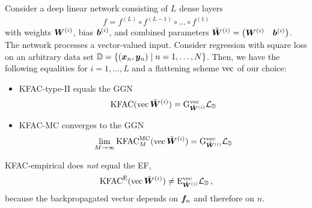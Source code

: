 \begin{test}
  Consider a deep linear network consisting of $L$ dense layers
  \begin{align*}
    f = f^{(L)} \circ f^{(L-1)} \circ \ldots \circ f^{(1)}
  \end{align*}
  with weights $\mW^{(i)}$, bias $\vb^{(i)}$, and combined parameters $\tilde{\mW}^{(i)} = \begin{pmatrix} \mW^{(i)} & \vb^{(i)} \end{pmatrix}$.
  The network processes a vector-valued input.
  Consider regression with square loss on an arbitrary data set $\sD = \{ (\vx_n, \vy_n) \mid n = 1, \dots, N \}$.
  Then, we have the following equalities for $i = 1, \dots, L$ and a flattening scheme $\vec$ of our choice:
  \begin{itemize}
  \item KFAC-type-II equals the GGN
    \begin{align*}
      \kfac(\vec \tilde{\mW}^{(i)}) = \ggn^{\vec}_{\tilde{\mW}^{(i)}} \gL_{\sD}
    \end{align*}
  \item KFAC-MC converges to the GGN
    \begin{align*}
      \lim_{M \to \infty} \kfac^{\text{MC}}_M(\vec \tilde{\mW}^{(i)}) = \ggn^{\vec}_{\tilde{\mW}^{(i)}} \gL_{\sD}
    \end{align*}

  \end{itemize}
  KFAC-empirical does \emph{not} equal the EF,
  \begin{align*}
    \kfac^{\text{E}}(\vec \tilde{\mW}^{(i)}) \neq \ef^{\vec}_{\tilde{\mW}^{(i)}} \gL_{\sD}\,,
  \end{align*}
  because the backpropagated vector depends on $\vf_n$ and therefore on $n$.
\end{test}


